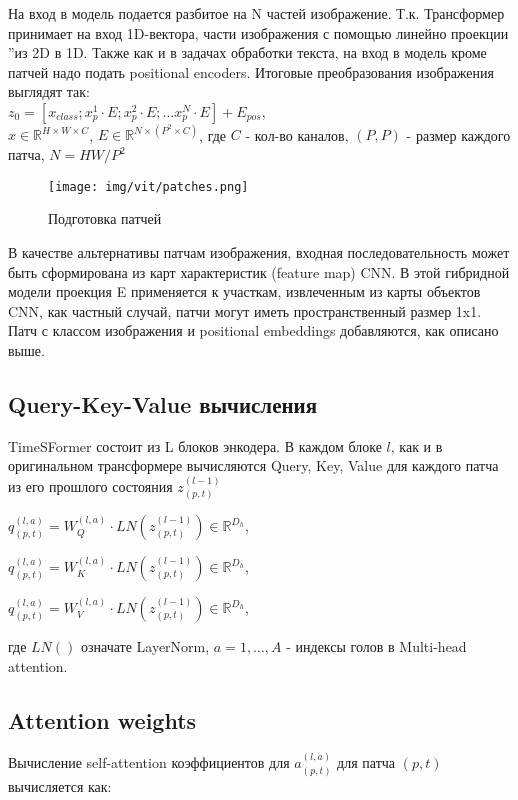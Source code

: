 \documentclass[PMI,VKR]{HSEUniversity}
\begin{document}
На вход в модель подается разбитое на N частей изображение. Т.к. Трансформер принимает на вход 1D-вектора,  части изображения с помощью линейно проекции \textquotedblright из 2D в 1D.
Также как и в задачах обработки текста, на вход в модель кроме патчей надо подать positional encoders.
Итоговые преобразования изображения выглядят так: \\

\noindent$z_{0} = [x_{class}; x^1_{p} \cdot E; x^2_{p} \cdot E; \dots x^N_{p} \cdot E] + E_{pos} $,\\
$x \in \mathds{R}^{H \times W \times C}$, $E \in \mathds{R}^{N \times (P^{2} \times C)}$,
где $C$ - кол-во каналов, $(P, P)$ - размер каждого патча, $N = HW / P^2$

\begin{figure}[h]
    \centering
    \texttt{[image: img/vit/patches.png]}
    \caption{Подготовка патчей}
\end{figure}

В качестве альтернативы патчам изображения, входная последовательность может быть сформирована
из карт характеристик (feature map) CNN. В этой гибридной модели проекция E применяется к участкам, извлеченным из карты объектов CNN, как частный случай, патчи могут иметь пространственный размер 1x1.
Патч с классом изображения и positional embeddings добавляются, как описано выше.


\subsection{Query-Key-Value вычисления}

TimeSFormer состоит из L блоков энкодера. В каждом блоке $l$, как и в оригинальном трансформере вычисляются Query, Key, Value для каждого патча из его прошлого состояния $z_{(p, t)}^{(l-1)}$

\begin{center}
    $q_{(p, t)}^{(l, a)} = W_{Q}^{(l, a)} \cdot LN(z_{(p, t)}^{(l-1)}) \in \mathds{R}^{D_{h}}$,

    $q_{(p, t)}^{(l, a)} = W_{K}^{(l, a)} \cdot LN(z_{(p, t)}^{(l-1)}) \in \mathds{R}^{D_{h}}$,

    $q_{(p, t)}^{(l, a)} = W_{V}^{(l, a)} \cdot LN(z_{(p, t)}^{(l-1)}) \in \mathds{R}^{D_{h}}$,
\end{center}
где $LN()$ означате LayerNorm, $a = 1, \dots, A$ - индексы голов в Multi-head attention.

\subsection{Attention weights}
Вычисление self-attention коэффициентов для $a_{(p, t)}^{(l, a)}$ для патча $(p, t)$ вычисляется как:
\end{document}

